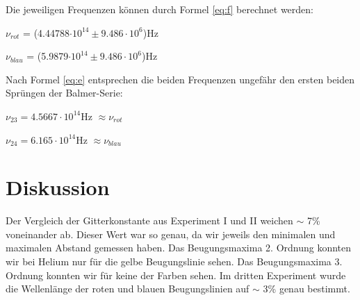\documentclass[12pt,a4paper]{article}
\begin{document}
\vspace{5pt}
Die jeweiligen Frequenzen k\"onnen durch Formel \ref{eq:f} berechnet werden:\vspace{5pt}

$\nu_{rot}$ = (4.44788$\cdot 10^{14} \pm 9.486 \cdot 10^6$)Hz

$\nu_{blau}$ = (5.9879$\cdot 10^{14} \pm 9.486 \cdot 10^6$)Hz

\vspace{5pt}
Nach Formel \ref{eq:e} entsprechen die beiden Frequenzen ungef\"ahr den ersten beiden Spr\"ungen der Balmer-Serie:\vspace{5pt}

$\nu_{23} = 4.5667\cdot 10^{14}$Hz $\approx\nu_{rot}$

$\nu_{24} = 6.165\cdot 10^{14}$Hz $\approx\nu_{blau}$


\section*{Diskussion}
Der Vergleich der Gitterkonstante aus Experiment I und II weichen $\sim$  7\% voneinander ab. Dieser Wert war so genau, da wir jeweils den minimalen und maximalen Abstand gemessen haben. Das Beugungsmaxima 2. Ordnung konnten wir bei Helium nur f\"ur die gelbe Beugungslinie sehen. Das Beugungsmaxima 3. Ordnung konnten wir f\"ur keine der Farben sehen.
Im dritten Experiment wurde die Wellenl\"ange der roten und blauen Beugungslinien auf $\sim$ 3\% genau bestimmt.
\end{document}
